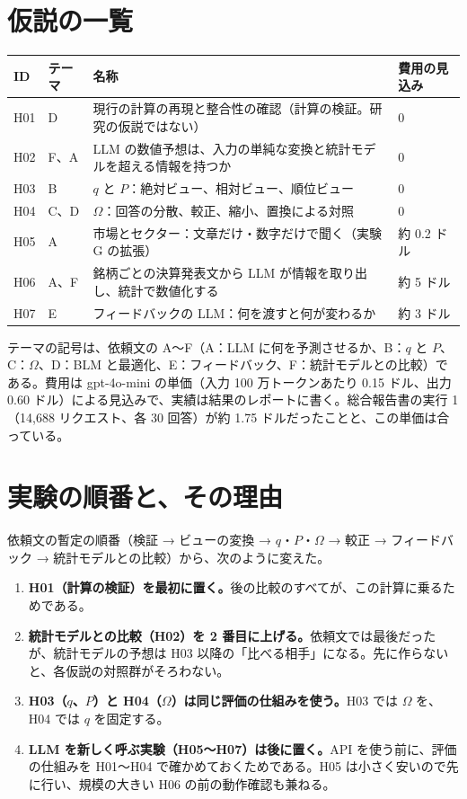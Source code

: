 \documentclass[xelatex,ja=standard,jafont=haranoaji,a4paper,10pt,openany]{bxjsreport}
\begin{document}
\section{仮説の一覧}

\begin{center}
\small
\begin{tabular}{p{0.9cm}p{1.2cm}p{9.8cm}p{2.0cm}}
\toprule
ID & テーマ & 名称 & 費用の見込み \\
\midrule
H01 & D & 現行の計算の再現と整合性の確認（計算の検証。研究の仮説ではない） & 0 \\
H02 & F、A & LLM の数値予想は、入力の単純な変換と統計モデルを超える情報を持つか & 0 \\
H03 & B & $q$ と $P$：絶対ビュー、相対ビュー、順位ビュー & 0 \\
H04 & C、D & $\Omega$：回答の分散、較正、縮小、置換による対照 & 0 \\
H05 & A & 市場とセクター：文章だけ・数字だけで聞く（実験 G の拡張） & 約 0.2 ドル \\
H06 & A、F & 銘柄ごとの決算発表文から LLM が情報を取り出し、統計で数値化する & 約 5 ドル \\
H07 & E & フィードバックの LLM：何を渡すと何が変わるか & 約 3 ドル \\
\bottomrule
\end{tabular}
\end{center}

テーマの記号は、依頼文の A〜F（A：LLM に何を予測させるか、B：$q$ と $P$、C：$\Omega$、D：BLM と最適化、E：フィードバック、F：統計モデルとの比較）である。費用は gpt-4o-mini の単価（入力 100 万トークンあたり 0.15 ドル、出力 0.60 ドル）による見込みで、実績は結果のレポートに書く。総合報告書の実行 1（14,688 リクエスト、各 30 回答）が約 1.75 ドルだったことと、この単価は合っている。

\section{実験の順番と、その理由}

依頼文の暫定の順番（検証 → ビューの変換 → $q$・$P$・$\Omega$ → 較正 → フィードバック → 統計モデルとの比較）から、次のように変えた。

\begin{enumerate}
\item \textbf{H01（計算の検証）を最初に置く。}後の比較のすべてが、この計算に乗るためである。
\item \textbf{統計モデルとの比較（H02）を 2 番目に上げる。}依頼文では最後だったが、統計モデルの予想は H03 以降の「比べる相手」になる。先に作らないと、各仮説の対照群がそろわない。
\item \textbf{H03（$q$、$P$）と H04（$\Omega$）は同じ評価の仕組みを使う。}H03 では $\Omega$ を、H04 では $q$ を固定する。
\item \textbf{LLM を新しく呼ぶ実験（H05〜H07）は後に置く。}API を使う前に、評価の仕組みを H01〜H04 で確かめておくためである。H05 は小さく安いので先に行い、規模の大きい H06 の前の動作確認も兼ねる。
\end{enumerate}
\end{document}
